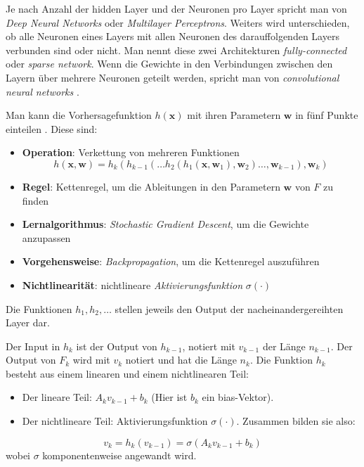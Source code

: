 Je nach Anzahl der hidden Layer und der Neuronen pro Layer spricht man von \textit{Deep Neural Networks} oder \textit{Multilayer Perceptrons}. Weiters wird unterschieden, ob
alle Neuronen eines Layers mit allen Neuronen des darauffolgenden Layers verbunden sind oder nicht. Man nennt diese zwei Architekturen \textit{fully-connected} oder \textit{sparse network}.
Wenn die Gewichte in den Verbindungen zwischen den Layern \"uber mehrere Neuronen geteilt werden, spricht man von \textit{convolutional neural networks} \cite[Kapitel 7.2]{strang}.

Man kann die Vorhersagefunktion $h(\mathbf{x})$ mit ihren Parametern $\mathbf{w}$ in f\"unf Punkte einteilen \cite[Kapitel 7.1]{strang}.
Diese sind:
\begin{itemize}
	\item \textbf{Operation}: Verkettung von mehreren Funktionen
	      $$h(\mathbf{x}, \mathbf{w}) = h_k(h_{k-1}(\dots h_2(h_1(\mathbf{x}, \mathbf{w}_1), \mathbf{w}_2)\dots,\mathbf{w}_{k-1}),\mathbf{w}_k)$$
	\item \textbf{Regel}: Kettenregel, um die Ableitungen in den Parametern $\mathbf{w}$ von $F$ zu finden
	\item \textbf{Lernalgorithmus}: \textit{Stochastic Gradient Descent}, um die Gewichte anzupassen
	\item \textbf{Vorgehensweise}: \textit{Backpropagation}, um die Kettenregel auszuf\"uhren
	\item \textbf{Nichtlinearit\"at}: nichtlineare \textit{Aktivierungsfunktion} $\sigma(\cdot)$
\end{itemize}

Die Funktionen $h_1, h_2, \dots$ stellen jeweils den Output der nacheinandergereihten Layer dar.

Der Input in $h_k$ ist der Output von $h_{k-1}$, notiert mit $v_{k-1}$ der L\"ange $n_{k-1}$. Der Output von $F_k$ wird mit $v_k$ notiert und hat die L\"ange $n_k$.
Die Funktion $h_k$ besteht aus einem linearen und einem nichtlinearen Teil:

\begin{itemize}
	\item Der lineare Teil: $A_k v_{k-1} + b_k$ (Hier ist $b_k$ ein bias-Vektor).
	\item Der nichtlineare Teil: Aktivierungsfunktion $\sigma(\cdot)$. Zusammen bilden sie also:
\end{itemize}
$$ v_k = h_k(v_{k-1}) = \sigma(A_k v_{k-1} + b_k) $$
wobei $\sigma$ komponentenweise angewandt wird.


